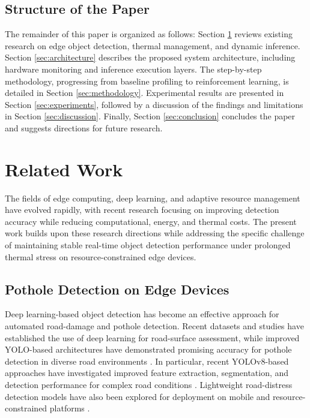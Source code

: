 \documentclass{ieeeaccess}
\begin{document}
\subsection{Structure of the Paper}
The remainder of this paper is organized as follows: Section \ref{sec:related_work} reviews existing research on edge object detection, thermal management, and dynamic inference. Section \ref{sec:architecture} describes the proposed system architecture, including hardware monitoring and inference execution layers. The step-by-step methodology, progressing from baseline profiling to reinforcement learning, is detailed in Section \ref{sec:methodology}. Experimental results are presented in Section \ref{sec:experiments}, followed by a discussion of the findings and limitations in Section \ref{sec:discussion}. Finally, Section \ref{sec:conclusion} concludes the paper and suggests directions for future research.

\section{Related Work}
\label{sec:related_work}
The fields of edge computing, deep learning, and adaptive resource management have evolved rapidly, with recent research focusing on improving detection accuracy while reducing computational, energy, and thermal costs. The present work builds upon these research directions while addressing the specific challenge of maintaining stable real-time object detection performance under prolonged thermal stress on resource-constrained edge devices.

\subsection{Pothole Detection on Edge Devices}

Deep learning-based object detection has become an effective approach for automated road-damage and pothole detection. Recent datasets and studies have established the use of deep learning for road-surface assessment, while improved YOLO-based architectures have demonstrated promising accuracy for pothole detection in diverse road environments \cite{b1,b2,b5,b6}. In particular, recent YOLOv8-based approaches have investigated improved feature extraction, segmentation, and detection performance for complex road conditions \cite{b3,b11,b12}. Lightweight road-distress detection models have also been explored for deployment on mobile and resource-constrained platforms \cite{b6}.
\end{document}
